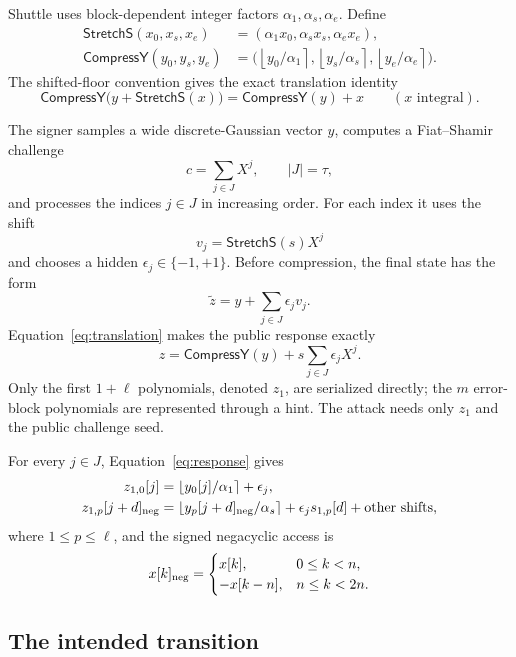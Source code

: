 \documentclass[11pt,a4paper]{article}
\newcommand{\round}[1]{\left\lfloor #1\right\rceil}
\newcommand{\Compress}{\mathsf{CompressY}}
\newcommand{\Stretch}{\mathsf{StretchS}}
\begin{document}
Shuttle uses block-dependent integer factors
$\alpha_1,\alpha_s,\alpha_e$.  Define
\begin{align*}
 \Stretch(x_0,x_s,x_e)
   &=(\alpha_1x_0,\alpha_sx_s,\alpha_ex_e),\\
 \Compress(y_0,y_s,y_e)
   &=\bigl(\round{y_0/\alpha_1},
            \round{y_s/\alpha_s},
            \round{y_e/\alpha_e}\bigr).
\end{align*}
The shifted-floor convention gives the exact translation identity
\begin{equation}
       \Compress\bigl(y+\Stretch(x)\bigr)=\Compress(y)+x
       \qquad(x\text{ integral}).
\label{eq:translation}
\end{equation}

The signer samples a wide discrete-Gaussian vector $y$, computes a Fiat--Shamir
challenge
\[
                  c=\sum_{j\in J}X^j,
                  \qquad |J|=\tau,
\]
and processes the indices $j\in J$ in increasing order.  For each index it
uses the shift
\[
                       v_j=\Stretch(s)X^j
\]
and chooses a hidden $\epsilon_j\in\{-1,+1\}$.  Before compression, the final
state has the form
\[
                \widetilde z=y+\sum_{j\in J}\epsilon_jv_j.
\]
Equation~\eqref{eq:translation} makes the public response exactly
\begin{equation}
       z=\Compress(y)+s\sum_{j\in J}\epsilon_jX^j.
\label{eq:response}
\end{equation}
Only the first $1+\ell$ polynomials, denoted $z_1$, are serialized directly;
the $m$ error-block polynomials are represented through a hint.  The attack
needs only $z_1$ and the public challenge seed.

For every $j\in J$, Equation~\eqref{eq:response} gives
\begin{align}
 z_{1,0}[j] &= \round{y_0[j]/\alpha_1}+\epsilon_j,
 \label{eq:anchor}\\
 z_{1,p}[j+d]_{\rm neg}
   &=\round{y_p[j+d]_{\rm neg}/\alpha_s}
     +\epsilon_js_{1,p}[d]+\text{other shifts},
 \label{eq:secretobs}
\end{align}
where $1\le p\le\ell$, and the signed negacyclic access is
\[
 x[k]_{\rm neg}=\begin{cases}
       x[k],&0\le k<n,\\
      -x[k-n],&n\le k<2n.
 \end{cases}
\]

\subsection{The intended transition}
\end{document}
